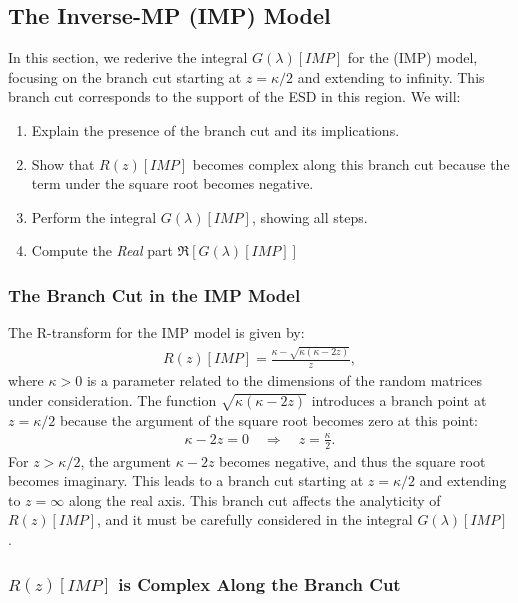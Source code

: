 \subsection{The Inverse-MP (IMP) Model}
\label{sxn:IMP}
In this section, we rederive the integral $G(\lambda)[IMP]$ for the \InverseMP (IMP) model, focusing on the branch cut starting at $z = \kappa/2$ and extending to infinity. 
This branch cut corresponds to the support of the ESD in this region. 
We will:
\begin{enumerate}
\item Explain the presence of the branch cut and its implications.
\item Show that $R(z)[IMP]$ becomes complex along this branch cut because the term under the square root becomes negative.
\item Perform the integral $G(\lambda)[IMP]$, showing all steps.
\item Compute the \emph{Real} part  $\Re[G(\lambda)[IMP]]$ 
\end{enumerate}

\subsubsection{The Branch Cut in the IMP Model}

The R-transform for the IMP model is given by:
\begin{align}
\label{eqn:iw_r_transf}
R(z)[IMP] = \frac{\kappa - \sqrt{\kappa(\kappa - 2z)}}{z},
\end{align}
where $\kappa > 0$ is a parameter related to the dimensions of the random matrices under consideration.
The function $\sqrt{\kappa(\kappa - 2z)}$ introduces a branch point at $z = \kappa/2$ because the argument of the square root becomes zero at this point:
\begin{align}
\kappa - 2z = 0 \quad \Rightarrow \quad z = \frac{\kappa}{2}.
\end{align}
For $z > \kappa/2$, the argument $\kappa - 2z$ becomes negative, and thus the square root becomes imaginary. 
This leads to a branch cut starting at $z = \kappa/2$ and extending to $z = \infty$ along the real axis. 
This branch cut affects the analyticity of $R(z)[IMP]$, and it must be carefully considered in the integral $G(\lambda)[IMP]$.

\subsubsection{\texorpdfstring{$R(z)[IMP]$}{R(z)[IMP]} is Complex Along the Branch Cut}

